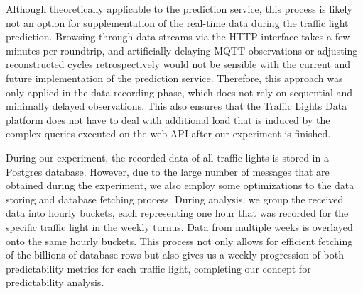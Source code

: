 Although theoretically applicable to the prediction service, this process is likely not an option for supplementation of the real-time data during the traffic light prediction. Browsing through data streams via the HTTP interface takes a few minutes per roundtrip, and artificially delaying MQTT observations or adjusting reconstructed cycles retrospectively would not be sensible with the current and future implementation of the prediction service. Therefore, this approach was only applied in the data recording phase, which does not rely on sequential and minimally delayed observations. This also ensures that the Traffic Lights Data platform does not have to deal with additional load that is induced by the complex queries executed on the web API after our experiment is finished.

During our experiment, the recorded data of all traffic lights is stored in a Postgres database. However, due to the large number of messages that are obtained during the experiment, we also employ some optimizations to the data storing and database fetching process. During analysis, we group the received data into hourly buckets, each representing one hour that was recorded for the specific traffic light in the weekly turnus. Data from multiple weeks is overlayed onto the same hourly buckets. This process not only allows for efficient fetching of the billions of database rows but also gives us a weekly progression of both predictability metrics for each traffic light, completing our concept for predictability analysis.

